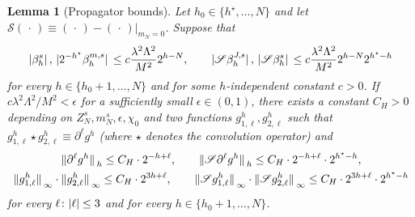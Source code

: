 \documentclass[a4paper, 11pt]{article}
\newcommand{\cutoff}{\Lambda}								%
\newcommand{\sing}[2]{{#1}^{#2}}							%
\theoremstyle{thm}
\newtheorem{lm}{Lemma}
\begin{document}
\begin{lm}[Propagator bounds]
\label{lm:propagator_bounds}
Let $h_0 \in \lbrace h^\star, \dots, N \rbrace$ and let $\mathscr{S}(\, \cdot \,) \equiv (\, \cdot \,) - (\, \cdot \,) \vert_{m_N = 0}$. Suppose that
\begin{equation}
\label{eq:lm:beta_bounds}
\abs*{\beta^s_h}, \, \abs*{2^{-h^\star} \beta^{m, s}_h} \le c \frac{\lambda^2 \cutoff^2}{M^2} 2^{h - N}, \qquad
\abs*{\mathscr{S} \beta^{J, s}_h}, \, \abs*{\mathscr{S} \beta^s_h} \le c \frac{\lambda^2 \cutoff^2}{M^2} 2^{h - N} 2^{h^\star - h}
\end{equation}
for every $h \in \lbrace h_0 + 1, \dots, N \rbrace$ and for some $h$-independent constant $c > 0$. If $c\lambda^2 \cutoff^2/M^2 < \epsilon$ for a sufficiently small $\epsilon \in (0, 1)$, there exists a constant $C_H > 0$ depending on $Z^s_N, m^s_N, \epsilon, \chi_0$ and two functions $\sing{g}{h}_{1, \ell}, \sing{g}{h}_{2, \ell}$ such that $\sing{g}{h}_{1, \ell} \star \sing{g}{h}_{2, \ell} \equiv \partial^\ell \sing{g}{h}$ (where $\star$ denotes the convolution operator) and
\begin{gather}
\begin{split}
\label{eq:propagator_weighted_norm}
\norm*{\partial^\ell \sing{g}{h}}_h \le C_H \cdot 2^{-h + \ell}, \qquad
\norm*{\mathscr{S} \partial^\ell \sing{g}{h}}_h \le C_H \cdot 2^{-h + \ell} \cdot 2^{h^\star - h},
\end{split} \\
\begin{split}
\label{eq:propagator_L_infty_norm}
\norm*{\sing{g}{h}_{1, \ell}}_{\infty} \cdot \norm*{\sing{g}{h}_{2, \ell}}_{\infty} \le C_H \cdot 2^{3h + \ell}, \qquad
\norm*{\mathscr{S} \sing{g}{h}_{1, \ell}}_{\infty} \cdot \norm*{\mathscr{S} \sing{g}{h}_{2, \ell}}_{\infty} \le C_H \cdot 2^{3h + \ell} \cdot 2^{h^\star - h}
\end{split}
\end{gather}
for every $\ell \colon \abs{\ell} \le 3$ and for every $h \in \lbrace h_0 + 1, \dots, N \rbrace$.
\end{lm}
\end{document}
